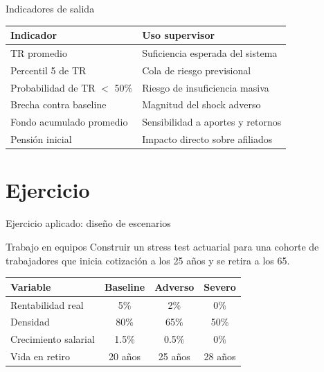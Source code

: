 \documentclass[aspectratio=169,11pt]{beamer}
\begin{document}
\begin{frame}{Indicadores de salida}
\begin{table}
\centering
\begin{tabular}{p{}p{}}
\toprule
Indicador & Uso supervisor \\
\midrule
TR promedio & Suficiencia esperada del sistema \\
Percentil 5 de TR & Cola de riesgo previsional \\
Probabilidad de TR $<$ 50\% & Riesgo de insuficiencia masiva \\
Brecha contra baseline & Magnitud del shock adverso \\
Fondo acumulado promedio & Sensibilidad a aportes y retornos \\
Pensión inicial & Impacto directo sobre afiliados \\
\bottomrule
\end{tabular}
\end{table}
\end{frame}

\section{Ejercicio}

\begin{frame}{Ejercicio aplicado: diseño de escenarios}
\begin{block}{Trabajo en equipos}
Construir un stress test actuarial para una cohorte de trabajadores que inicia cotización a los 25 años y se retira a los 65.
\end{block}

\begin{table}
\centering
\begin{tabular}{lccc}
\toprule
Variable & Baseline & Adverso & Severo \\
\midrule
Rentabilidad real & 5\% & 2\% & 0\% \\
Densidad & 80\% & 65\% & 50\% \\
Crecimiento salarial & 1.5\% & 0.5\% & 0\% \\
Vida en retiro & 20 años & 25 años & 28 años \\
\bottomrule
\end{tabular}
\end{table}
\end{frame}
\end{document}
